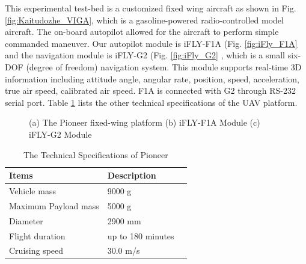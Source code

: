 This experimental test-bed is  a customized fixed wing aircraft as shown in Fig. \ref{fig:Kaitudozhe_VIGA}, which is a gasoline-powered radio-controlled model aircraft. The on-board autopilot allowed for the aircraft to perform simple commanded maneuver. Our autopilot module is iFLY-F1A (Fig. \ref{fig:iFly_F1A} and the navigation module is iFLY-G2 (Fig. \ref{fig:iFly_G2} \cite{IFLY}, which is a small six-DOF (degree of freedom) navigation system. This module supports real-time 3D information including attitude angle, angular rate, position, speed, acceleration, true air speed, calibrated air speed. F1A is connected with G2 through RS-232 serial port. Table \ref{tab:platform_specifications} lists the other technical specifications of the UAV platform.

\begin{figure}[!tb]
	\centering
	\caption{(a) The Pioneer fixed-wing platform (b) iFLY-F1A Module   (c) iFLY-G2 Module}
\end{figure}



\begin{table}
	\caption{The Technical Specifications of Pioneer}
	\label{tab:platform_specifications}
	\begin{center}
		\renewcommand{\arraystretch}{1.1}
		\begin{tabular}{lll}
			\hline
			\textbf {Items}  & \textbf{Description} \\
			\hline
			Vehicle mass & 9000 g \\
			Maximum Payload mass & 5000 g \\
			Diameter & 2900 mm \\
			Flight duration & up to 180 minutes \\
			Cruising speed & 30.0 m/s \\
			\hline
		\end{tabular}
	\end{center}
\end{table}

